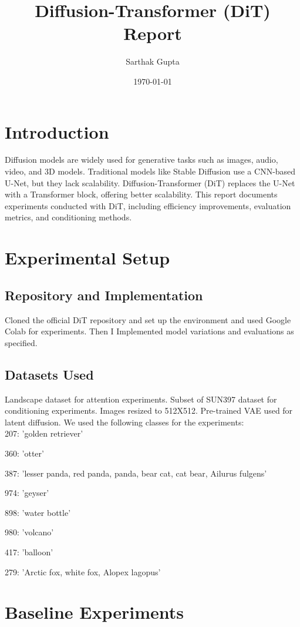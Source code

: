 \documentclass{article}
\title{Diffusion-Transformer (DiT) Report}
\author{Sarthak Gupta}
\date{\today}
\begin{document}
\maketitle

\section{Introduction}
Diffusion models are widely used for generative tasks such as images, audio, video, and 3D models. Traditional models like Stable Diffusion use a CNN-based U-Net, but they lack scalability. Diffusion-Transformer (DiT) replaces the U-Net with a Transformer block, offering better scalability. This report documents experiments conducted with DiT, including efficiency improvements, evaluation metrics, and conditioning methods. 

\section{Experimental Setup}
\subsection{Repository and Implementation}

Cloned the official DiT repository and set up the environment and used Google Colab for experiments. Then I Implemented model variations and evaluations as specified.

\subsection{Datasets Used}

Landscape dataset for attention experiments.
Subset of SUN397 dataset for conditioning experiments.
Images resized to 512X512.
Pre-trained VAE used for latent diffusion.
We used the following classes for the experiments:\\

207: 'golden retriever'

360: 'otter'

387: 'lesser panda, red panda, panda, bear cat, cat bear, Ailurus fulgens'

974: 'geyser'

898: 'water bottle' 

980: 'volcano'

417: 'balloon'

279: 'Arctic fox, white fox, Alopex lagopus'


\section{Baseline Experiments}
\end{document}
